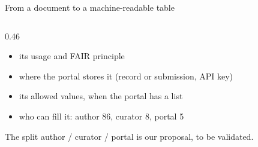 \documentclass[aspectratio=169,10pt]{beamer}
\newcommand{\evidence}[1]{{\scriptsize\color{epgrey}#1}}
\begin{document}
\begin{frame}{From a document to a machine-readable table}
\begin{columns}[T]
\begin{column}{0.46\textwidth}
      \begin{itemize}
        \item its usage and FAIR principle
        \item where the portal stores it (record or submission, API key)
        \item its allowed values, when the portal has a list
        \item who can fill it: author 86, curator 8, portal 5
      \end{itemize}
      \evidence{The split author / curator / portal is our proposal, to be validated.}
    \end{column}
  \end{columns}
\end{frame}

\end{document}
